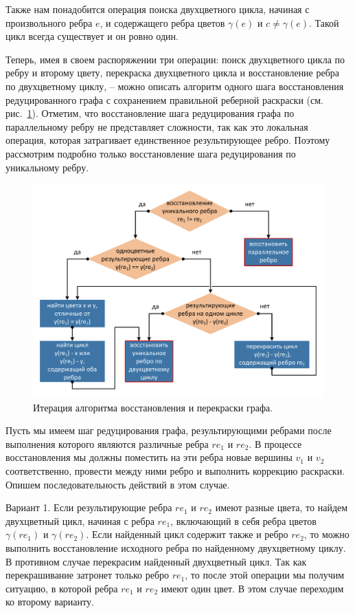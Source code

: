 Также нам понадобится операция поиска двухцветного цикла, начиная с произвольного ребра $e$, и содержащего ребра цветов $\gamma(e)$ и $c \ne \gamma(e)$. Такой цикл всегда существует и он ровно один.

Теперь, имея в своем распоряжении три операции: поиск двухцветного цикла по ребру и второму цвету, перекраска двухцветного цикла и восстановление ребра по двухцветному циклу, -- можно описать алгоритм одного шага восстановления редуцированного графа с сохранением правильной реберной раскраски (см. рис.~\ref{fig:text_3_edge_coloring_7}).
Отметим, что восстановление шага редуцирования графа по параллельному ребру не представляет сложности, так как это локальная операция, которая затрагивает единственное результирующее ребро.
Поэтому рассмотрим подробно только восстановление шага редуцирования по уникальному ребру.

\begin{figure}[ht]
\centering
\includegraphics[width=1.0\textwidth]{fig/par_edge_col_7-algorithm.pdf}
\singlespacing
{}\caption{Итерация алгоритма восстановления и перекраски графа.}
\label{fig:text_3_edge_coloring_7}
\end{figure}

Пусть мы имеем шаг редуцирования графа, результирующими ребрами после выполнения которого являются различные ребра $re_1$ и $re_2$.
В процессе восстановления мы должны поместить на эти ребра новые вершины $v_1$ и $v_2$ соответственно, провести между ними ребро и выполнить коррекцию раскраски.
Опишем последовательность действий в этом случае.

Вариант 1. Если результирующие ребра $re_1$ и $re_2$ имеют разные цвета, то найдем двухцветный цикл, начиная с ребра $re_1$, включающий в себя ребра цветов $\gamma(re_1)$ и $\gamma(re_2)$.
Если найденный цикл содержит также и ребро $re_2$, то можно выполнить восстановление исходного ребра по найденному двухцветному циклу.
В противном случае перекрасим найденный двухцветный цикл.
Так как перекрашивание затронет только ребро $re_1$, то после этой операции мы получим ситуацию, в которой ребра $re_1$ и $re_2$ имеют один цвет.
В этом случае переходим ко второму варианту.

